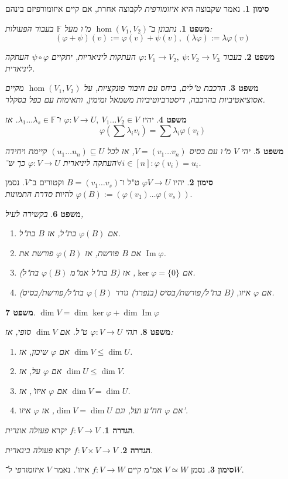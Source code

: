 \documentclass[]{article}
\DeclareMathOperator\Img   {Im}
\newcommand\F         {\mathbb{F}}
\newcommand\co        {\colon}
\renewcommand\lg      {\lambda}
\renewcommand\phi     {\varphi}
\newtheorem{Theorem}{משפט}
\theoremstyle{definition}
\newtheorem{definition}{הגדרה}
\newtheorem{Notion}{סימון}
\newcommand\theo  [1] {\begin{Theorem}#1\end{Theorem}}
\newcommand\defi  [1] {\begin{definition}#1\end{definition}}
\newcommand\noti  [1] {\begin{Notion}#1\end{Notion}}
\begin{document}
\begin{multicols}{2}
{\begin{enumerate}
		\end{enumerate}}
		\noti{נאמר שקבוצה היא \textit{איזומורפית} לקבוצה אחרת, אם קיים איזומורפיזם בינהם}
		\theo{נתבונן ב־$\hom(V_1, V_2)$ מ"ו מעל $\F$ בעבור הפעולות: 
		\[ (\phi + \psi)(v) := \phi(v) + \psi(v), \ (\lg\phi) := \lg\phi(v) \]}
		\theo{בעבור $\phi \co V_1 \to V_2, \ \psi \co V_2 \to V_3$ העתקות ליניאריות, יתקיים $\psi \circ \phi$ העתקה ליניארית. }
		\theo{הרכבת ט"לים, ביחס עם חיבור פונקציות, על $\hom(V_1, V_2)$ מקיים אסוציאטיביות בהרכבה, דיסטרביוטיביות משמאל ומימין, ותאימות עם כפל בסקלר. }
		\theo{יהיו $\phi \co V \to U, \ V_1 \dots V_2 \in V$ ו־$\lg_1 \dots \lg_s \in \F$. אז 
		\[ \phi(\sum\lg_iv_i) = \sum\lg_i\phi(v_i) \]}
		\theo{יהי $V$ מ"ו עם בסיס $V = (v_1 \dots v_n)$, אז לכל $(u_1 \dots u_n) \subseteq U$ קיימת ויחידה העתקה ליניארית $\phi \co V \to U$ כך ש־$\forall i \in [n] \co \phi(v_i) = u_i$. }
		\noti{יהיו $\phi V \to U$ ט"ל ו־$B = (v_1 \dots v_s)$ וקטורים ב־$V$. נסמן $\phi(B) := (\phi(v_1) \dots \phi(v_s))$ להיות \textit{סדרת התמונות}. }
		\theo{בקשירה לעיל, 
		\begin{enumerate}
			\item אם $\phi(B)$ בת"ל, אז $B$ בת"ל. 
			\item אם $B$ פורשת, אז $\phi(B)$ פורשת את $\Img\phi$. 
			\item אם $\ker\phi = \{0\}$, אז ($B$ בת"ל אמ"מ $\phi(B)$ בת"ל). 
			\item אם $\phi$ איזו, ($B$ בת"ל/פורשת/בסיס (בנפרד) גורר $\phi(B)$ בת"ל/פורשת/בסיס). 
		\end{enumerate}}
		\theo{\hfil $\dim V = \dim \ker\phi + \dim\Img\phi$}
		\theo{תהי $\phi \co V \to U$ ט"ל. אם $\dim V$ סופי, אז: 
		\begin{enumerate}
			\item אם $\phi$ שיכון, אז $\dim V \le \dim U$. 
			\item אם $\phi$ על, אז $\dim U \le \dim V$. 
			\item אם $\phi$ איזו', אז $\dim V = \dim U$. 
			\item אם $\phi$ חח"ע ועל, וגם $\dim V = \dim U$, אז $\phi$ איזו'. 
		\end{enumerate}}
		\defi{$f \co V \to V$ יקרא \textit{פעולה אונרית}. }
		\defi{$f \co V \times V \to V$ יקרא \textit{פעולה בינארית}. }
		\noti{נסמן $V \simeq W$ אמ"מ קיים $f \co V \to W$ איזו'. נאמר $V$ \textit{איזומורפי} ל־$W$. }
		

\end{multicols}
\end{document}
